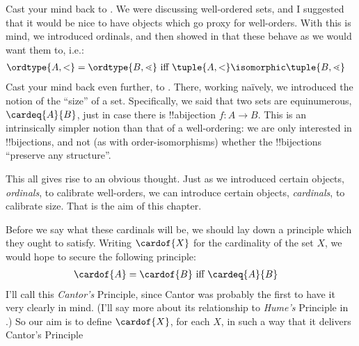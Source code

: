 \documentclass[../../../include/open-logic-section]{subfiles}
\begin{document}
Cast your mind back to . We were discussing well-ordered sets, and I suggested that it would be nice to have objects which go proxy for well-orders. With this is mind, we introduced ordinals, and then showed in  that these behave as we would want them to, i.e.:
\begin{align*}
	\ordtype{A, <} = \ordtype{B, \lessdot}&\text{ iff }\tuple{A, <} \isomorphic \tuple{B, \lessdot}
\end{align*}
Cast your mind back even further, to . There, working na\"ively, we introduced the notion of the ``size'' of a set. Specifically, we said that two sets are equinumerous, $\cardeq{A}{B}$, just in case there is !!a{bijection} $f \colon A \to B$. This is an intrinsically {simpler} notion than that of a well-ordering: we are only interested in !!{bijection}s, and not (as with order-isomorphisms) whether the !!{bijection}s ``preserve any structure''.

This all gives rise to an obvious thought. Just as we introduced certain objects, \emph{ordinals}, to calibrate well-orders, we can introduce certain objects, \emph{cardinals}, to calibrate size. That is the aim of this chapter. 

Before we say what these cardinals will be, we should lay down a principle which they ought to satisfy. Writing $\cardof{X}$ for the cardinality of the set $X$, we would hope to secure the following principle:
\begin{align*}
	\cardof{A} = \cardof{B}&\text{ iff }\cardeq{A}{B}
\end{align*}
I'll call this \emph{Cantor's} Principle, since Cantor was probably the first to have it very clearly in mind. (I'll say more about its relationship to \emph{Hume's} Principle in .) So our aim is to define $\cardof{X}$, for each $X$, in such a way that it delivers Cantor's Principle
\end{document}
